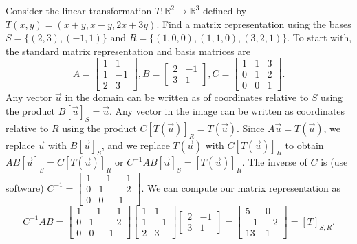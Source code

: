 \begin{example}
Consider the linear transformation $T\colon{\mathbb{R}}^2\to {\mathbb{R}}^3$ defined by $T(x,y)=(x+y,x-y,2x+3y)$. Find a matrix representation using the bases $S=\{(2,3),(-1,1)\}$ and $R=\{(1,0,0),(1,1,0),(3,2,1)\}$.  To start with, the standard matrix representation and basis matrices are 
$$
A=
\begin{bmatrix}
 1 & 1 \\
 1 & -1 \\
 2 & 3
\end{bmatrix},
B=
\begin{bmatrix}
 2 & -1 \\
 3 & 1
\end{bmatrix}
,
C=
\begin{bmatrix}
 1 & 1 & 3 \\
 0 & 1 & 2 \\
 0 & 0 & 1
\end{bmatrix}
.$$
Any vector $\vec u$ in the domain can be written as of coordinates relative to $S$ using the product $ B[\vec u]_S=\vec u$.
Any vector in the image can be written as coordinates relative to $R$ using the product $C[T(\vec u)]_{R} = T(\vec u)$.  Since $A\vec u = T(\vec u)$, we replace $\vec u$ with $B[\vec u]_S$, and we replace $T(\vec u)$ with $C[T(\vec u)]_{R}$ to obtain $AB[\vec u]_S = C[T(\vec u)]_{R}$ or $C^{-1}AB[\vec u]_S=[T(\vec u)]_{R}$.  The inverse of $C$ is (use software) 
$
C^{-1}=
\begin{bmatrix}
 1 & -1 & -1 \\
 0 & 1 & -2 \\
 0 & 0 & 1
\end{bmatrix}
$.  
We can compute our matrix representation as 
$$C^{-1}AB = 
\begin{bmatrix}
 1 & -1 & -1 \\
 0 & 1 & -2 \\
 0 & 0 & 1
\end{bmatrix}
\begin{bmatrix}
 1 & 1 \\
 1 & -1 \\
 2 & 3
\end{bmatrix}
\begin{bmatrix}
 2 & -1 \\
 3 & 1
\end{bmatrix}
=
\begin{bmatrix}
 5 & 0 \\
 -1 & -2 \\
 13 & 1
\end{bmatrix}=[T]_{S,R}.
$$
\end{example}

